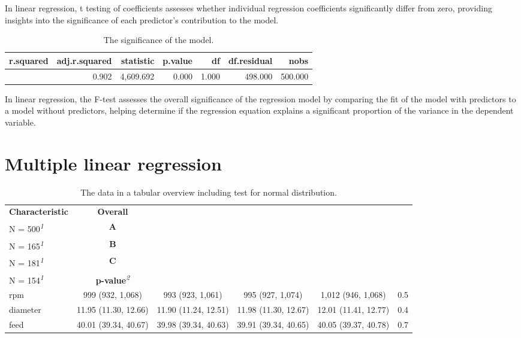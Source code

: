\documentclass[
  a4paper,
]{scrbook}
\begin{document}
\endgroup

In linear regression, t testing of coefficients assesses whether
individual regression coefficients significantly differ from zero,
providing insights into the significance of each predictor's
contribution to the model.

\begingroup
\fontsize{12.0pt}{14.4pt}\selectfont

\begin{longtable}{rrrrrrr}

\caption{\label{tbl-lm-f-test}The significance of the model.}

\tabularnewline

\toprule
r.squared & adj.r.squared & statistic & p.value & df & df.residual & nobs \\ 
\midrule\addlinespace[2.5pt]
0.902 & 0.902 & 4,609.692 & 0.000 & 1.000 & 498.000 & 500.000 \\ 
\bottomrule

\end{longtable}

\endgroup

In linear regression, the F-test assesses the overall significance of
the regression model by comparing the fit of the model with predictors
to a model without predictors, helping determine if the regression
equation explains a significant proportion of the variance in the
dependent variable.

\section{Multiple linear regression}\label{multiple-linear-regression}

\begingroup
\fontsize{12.0pt}{14.4pt}\selectfont
\setlength{\LTpost}{0mm}

\begin{longtable}{lccccc}

\caption{\label{tbl-mlm-eda}The data in a tabular overview including
test for normal distribution.}

\tabularnewline

\toprule
\textbf{Characteristic} & \textbf{Overall}\\
N = 500\textsuperscript{\textit{1}} & \textbf{A}\\
N = 165\textsuperscript{\textit{1}} & \textbf{B}\\
N = 181\textsuperscript{\textit{1}} & \textbf{C}\\
N = 154\textsuperscript{\textit{1}} & \textbf{p-value}\textsuperscript{\textit{2}} \\ 
\midrule\addlinespace[2.5pt]
rpm & 999 (932, 1,068) & 993 (923, 1,061) & 995 (927, 1,074) & 1,012 (946, 1,068) & 0.5 \\ 
diameter & 11.95 (11.30, 12.66) & 11.90 (11.24, 12.51) & 11.98 (11.30, 12.67) & 12.01 (11.41, 12.77) & 0.4 \\ 
feed & 40.01 (39.34, 40.67) & 39.98 (39.34, 40.63) & 39.91 (39.34, 40.65) & 40.05 (39.37, 40.78) & 0.7 \\ 
\bottomrule

\end{longtable}
\end{document}
